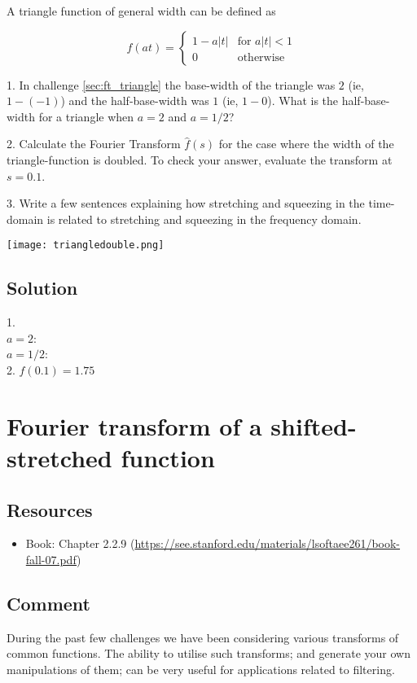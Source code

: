 A triangle function of general width can be defined as

\begin{equation}
    f(at)=
    \begin{cases}
        1 - a|t| & \text{for } a|t| < 1\\
        0 & \text{otherwise}
    \end{cases}
\end{equation}

1. In challenge \ref{sec:ft_triangle} the base-width of the triangle was $2$ (ie, $1-(-1)$) and the half-base-width was $1$ (ie, $1-0$). What is the half-base-width for a triangle when $a=2$ and $a=1/2$?

2. Calculate the Fourier Transform $\hat{f}(s)$ for the case where the width of the triangle-function is doubled. To check your answer, evaluate the transform at $s=0.1$.

3. Write a few sentences explaining how stretching and squeezing in the time-domain is related to stretching and squeezing in the frequency domain.

\texttt{[image: triangledouble.png]}

\subsection*{Solution}
1.\\
$a=2$: \\
$a=1/2$: \\

2. $\hat{f}(0.1)=1.75$




\newpage
\section{Fourier transform of a shifted-stretched function}
\label{sec:shiftstretch}

\subsection*{Resources}
\begin{itemize}
    \item Book: Chapter 2.2.9 (\url{https://see.stanford.edu/materials/lsoftaee261/book-fall-07.pdf})
\end{itemize}

\subsection*{Comment}
During the past few challenges we have been considering various transforms of common functions. The ability to utilise such transforms; and generate your own manipulations of them; can be very useful for applications related to filtering.

